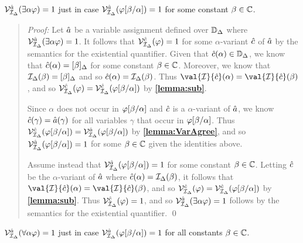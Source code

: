 \begin{Lthm} \label{lemma:quantE}
  $\mathcal{V}_{\mathcal{I}_{\Delta}}^{\hat{a}}(\exists \alpha\varphi)=1$ just in case $\mathcal{V}_{\mathcal{I}_{\Delta}}^{\hat{a}}(\varphi[\beta/\alpha])=1$ for some constant $\beta\in\mathbb{C}$.
\end{Lthm}


\begin{quote} 
  \textit{Proof:}
  Let $\hat{a}$ be a variable assignment defined over $\mathbb{D}_{\Delta}$ where $\mathcal{V}_{\mathcal{I}_{\Delta}}^{\hat{a}}(\exists \alpha\varphi)=1$.
  It follows that $\mathcal{V}_{\mathcal{I}_{\Delta}}^{\hat{c}}(\varphi)=1$ for some $\alpha$-variant $\hat{c}$ of $\hat{a}$ by the semantics for the existential quantifier.
  Given that $\hat{c}(\alpha)\in\mathbb{D}_{\Delta}$, we know that $\hat{c}(\alpha)=[\beta]_{\Delta}$ for some constant $\beta\in\mathbb{C}$.
  Moreover, we know that $\mathcal{I}_{\Delta}(\beta)=[\beta]_{\Delta}$ and so $\hat{c}(\alpha)=\mathcal{I}_{\Delta}(\beta)$.
  Thus $\val{\I}{\va{c}}(\alpha)=\val{\I}{\va{c}}(\beta)$, and so $\mathcal{V}_{\mathcal{I}_{\Delta}}^{\hat{c}}(\varphi)=\mathcal{V}_{\mathcal{I}_{\Delta}}^{\hat{c}}(\varphi[\beta/\alpha])$ by \textbf{\ref{lemma:sub}}.

  Since $\alpha$ does not occur in $\varphi[\beta/\alpha]$ and $\hat{c}$ is a $\alpha$-variant of $\hat{a}$, we know $\hat{c}(\gamma) = \hat{a}(\gamma)$ for all variables $\gamma$ that occur in $\varphi[\beta/\alpha]$.
  Thus $\mathcal{V}_{\mathcal{I}_{\Delta}}^{\hat{c}}(\varphi[\beta/\alpha])=\mathcal{V}_{\mathcal{I}_{\Delta}}^{\hat{a}}(\varphi[\beta/\alpha])$ by \textbf{\ref{lemma:VarAgree}}, and so $\mathcal{V}_{\mathcal{I}_{\Delta}}^{\hat{a}}(\varphi[\beta/\alpha]) = 1$ for some $\beta\in\mathbb{C}$ given the identities above.

  Assume instead that $\mathcal{V}_{\mathcal{I}_{\Delta}}^{\hat{a}}(\varphi[\beta/\alpha])=1$ for some constant $\beta\in\mathbb{C}$.
  Letting $\hat{c}$ be the $\alpha$-variant of $\hat{a}$ where $\hat{c}(\alpha)=\mathcal{I}_{\Delta}(\beta)$, it follows that $\val{\I}{\va{c}}(\alpha)=\val{\I}{\va{c}}(\beta)$, and so $\mathcal{V}_{\mathcal{I}_{\Delta}}^{\hat{c}}(\varphi)=\mathcal{V}_{\mathcal{I}_{\Delta}}^{\hat{c}}(\varphi[\beta/\alpha])$ by \textbf{\ref{lemma:sub}}.
  Thus $\mathcal{V}_{\mathcal{I}_{\Delta}}^{\hat{c}}(\varphi)=1$, and so $\mathcal{V}_{\mathcal{I}_{\Delta}}^{\hat{a}}(\exists \alpha\varphi)=1$ follows by the semantics for the existential quantifier. 
  \qed
\end{quote}






\begin{Lthm} \label{lemma:quantA}
  $\mathcal{V}_{\mathcal{I}_{\Delta}}^{\hat{a}}(\forall \alpha\varphi)=1$ just in case $\mathcal{V}_{\mathcal{I}_{\Delta}}^{\hat{a}}(\varphi[\beta/\alpha])=1$ for all constants $\beta\in\mathbb{C}$.
\end{Lthm}

